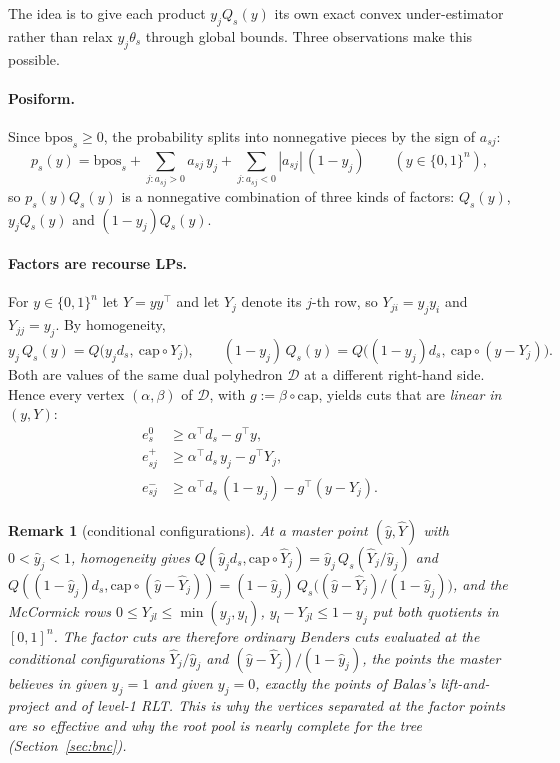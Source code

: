 \documentclass[11pt]{article}
\newtheorem{remark}{Remark}
\newcommand{\bpos}{\mathrm{bpos}}
\newcommand{\capa}{\mathrm{cap}}
\newcommand{\D}{\mathcal{D}}
\newcommand{\T}{^{\top}}
\begin{document}
The idea is to give each product $y_jQ_s(y)$ its own exact convex under-estimator rather than relax $y_j\theta_s$
through global bounds. Three observations make this possible.

\paragraph{Posiform.} Since $\bpos_s\ge0$, the probability splits into nonnegative pieces by the sign of $a_{sj}$:
\begin{equation}\label{eq:posiform}
p_s(y) = \bpos_s + \sum_{j: a_{sj}>0} a_{sj}\,y_j + \sum_{j:a_{sj}<0} |a_{sj}|\,(1-y_j)\qquad (y\in\{0,1\}^n),
\end{equation}
so $p_s(y)Q_s(y)$ is a nonnegative combination of three kinds of factors: $Q_s(y)$, $y_jQ_s(y)$ and $(1-y_j)Q_s(y)$.

\paragraph{Factors are recourse LPs.} For $y\in\{0,1\}^n$ let $Y = yy\T$ and let $Y_j$ denote its $j$-th row, so
$Y_{ji} = y_jy_i$ and $Y_{jj} = y_j$. By homogeneity,
\begin{equation}\label{eq:factors}
y_j\,Q_s(y) = Q\big(y_j d_s,\ \capa\circ Y_j\big),\qquad (1-y_j)\,Q_s(y) = Q\big((1-y_j)d_s,\ \capa\circ(y - Y_j)\big).
\end{equation}
Both are values of the same dual polyhedron $\D$ at a different right-hand side. Hence every vertex $(\alpha,\beta)$
of $\D$, with $g := \beta\circ\capa$, yields cuts that are \emph{linear in $(y,Y)$}:
\begin{align}
e^0_s &\ge \alpha\T d_s - g\T y, \label{eq:cut0}\\
e^+_{sj} &\ge \alpha\T d_s\, y_j - g\T Y_j, \label{eq:cutp}\\
e^-_{sj} &\ge \alpha\T d_s\,(1-y_j) - g\T(y - Y_j). \label{eq:cutm}
\end{align}
\begin{remark}[conditional configurations]\label{rem:cond}
At a master point $(\hat y,\hat Y)$ with $0<\hat y_j<1$, homogeneity gives
$Q(\hat y_j d_s, \capa\circ\hat Y_j) = \hat y_j\,Q_s(\hat Y_j/\hat y_j)$ and
$Q((1-\hat y_j)d_s, \capa\circ(\hat y-\hat Y_j)) = (1-\hat y_j)\,Q_s\big((\hat y-\hat Y_j)/(1-\hat y_j)\big)$, and the
McCormick rows $0\le Y_{jl}\le\min(y_j,y_l)$, $y_l - Y_{jl}\le 1-y_j$ put both quotients in $[0,1]^n$. The factor
cuts are therefore ordinary Benders cuts evaluated at the \emph{conditional configurations} $\hat Y_j/\hat y_j$ and
$(\hat y-\hat Y_j)/(1-\hat y_j)$, the points the master believes in given $y_j = 1$ and given $y_j = 0$, exactly the
points of Balas's lift-and-project and of level-1 RLT. This is why the vertices separated at the factor points are
so effective and why the root pool is nearly complete for the tree (Section~\ref{sec:bnc}).
\end{remark}
\end{document}
